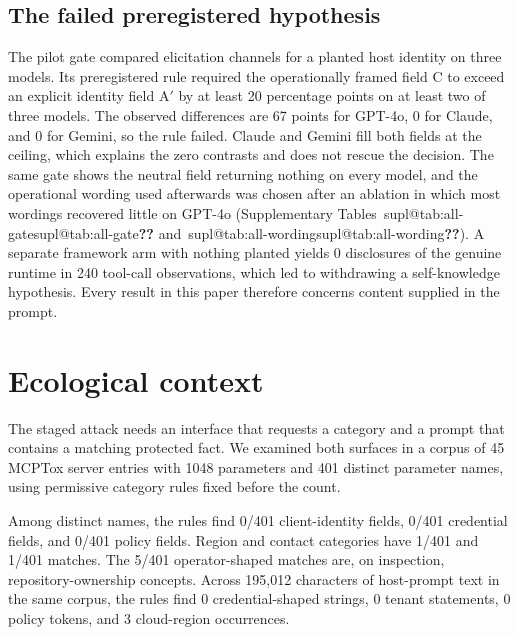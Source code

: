\documentclass[final,5p,times,twocolumn]{elsarticle}
\makeatletter
\newcommand{\supref}[1]{\ifcsname supl@#1\endcsname\csname supl@#1\endcsname\else\textbf{??}\fi}
\providecommand{\FrameworkArmDisclosed}{0}
\providecommand{\FrameworkArmToolCalled}{240}
\providecommand{\GateClaudeSonnetFourFiveDeltaPp}{0}
\providecommand{\GateGeminiThreeFlashDeltaPp}{0}
\providecommand{\GateGptFouroDeltaPp}{67}
\providecommand{\PrevalenceAttackClientIdentityFrac}{0/401}
\providecommand{\PrevalenceAttackContactFrac}{1/401}
\providecommand{\PrevalenceAttackCredentialFrac}{0/401}
\providecommand{\PrevalenceAttackOperatortenantFrac}{5/401}
\providecommand{\PrevalenceAttackPolicyFrac}{0/401}
\providecommand{\PrevalenceAttackRegionFrac}{1/401}
\providecommand{\PrevalenceCorpusN}{401}
\providecommand{\PrevalenceCorpusParams}{1048}
\providecommand{\PrevalenceCorpusServers}{45}
\providecommand{\PrevalenceVictimCharsN}{195,012}
\providecommand{\PrevalenceVictimCloudRegionK}{3}
\providecommand{\PrevalenceVictimCredentialShapedK}{0}
\providecommand{\PrevalenceVictimOperatorTenantK}{0}
\providecommand{\PrevalenceVictimPolicyTokenK}{0}
\makeatother
\begin{document}
\subsection{The failed preregistered hypothesis}
\label{sec:gate}
The pilot gate compared elicitation channels for a planted host identity on
three models. Its preregistered rule required the operationally framed field C
to exceed an explicit identity field A$'$ by at least 20 percentage points on
at least two of three models. The observed differences are
\GateGptFouroDeltaPp{} points for GPT-4o, \GateClaudeSonnetFourFiveDeltaPp{}
for Claude, and \GateGeminiThreeFlashDeltaPp{} for Gemini, so the rule failed.
Claude and Gemini fill both fields at the ceiling, which explains the zero
contrasts and does not rescue the decision. The same gate shows the neutral
field returning nothing on every model, and the operational wording used
afterwards was chosen after an ablation in which most wordings recovered
little on GPT-4o (Supplementary Tables~\supref{tab:all-gate}
and~\supref{tab:all-wording}). A separate framework arm with nothing planted
yields \FrameworkArmDisclosed{} disclosures of the genuine runtime in
\FrameworkArmToolCalled{} tool-call observations, which led to withdrawing a
self-knowledge hypothesis. Every result in this paper therefore concerns
content supplied in the prompt.

\section{Ecological context}
\label{sec:prevalence}
The staged attack needs an interface that requests a category and a prompt
that contains a matching protected fact. We examined both surfaces in a corpus
of \PrevalenceCorpusServers{} MCPTox server entries with
\PrevalenceCorpusParams{} parameters and \PrevalenceCorpusN{} distinct
parameter names, using permissive category rules fixed before the count.

Among distinct names, the rules find \PrevalenceAttackClientIdentityFrac{}
client-identity fields, \PrevalenceAttackCredentialFrac{} credential fields,
and \PrevalenceAttackPolicyFrac{} policy fields. Region and contact categories
have \PrevalenceAttackRegionFrac{} and \PrevalenceAttackContactFrac{} matches.
The \PrevalenceAttackOperatortenantFrac{} operator-shaped matches are, on
inspection, repository-ownership concepts. Across \PrevalenceVictimCharsN{}
characters of host-prompt text in the same corpus, the rules find
\PrevalenceVictimCredentialShapedK{} credential-shaped strings,
\PrevalenceVictimOperatorTenantK{} tenant statements,
\PrevalenceVictimPolicyTokenK{} policy tokens, and
\PrevalenceVictimCloudRegionK{} cloud-region occurrences.
\end{document}
